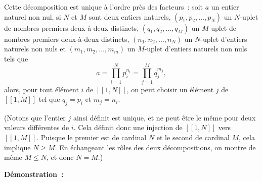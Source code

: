 Cette décomposition est unique à l'ordre près des facteurs : soit $a$ un entier naturel non nul, si $N$ et $M$ sont deux entiers naturels, $\left( p_1, p_2, \dots, p_N \right)$ un $N$-uplet de nombres premiers deux-à-deux distincts, $\left( q_1, q_2, \dots, q_M \right)$ un $M$-uplet de nombres premiers deux-à-deux distincts, $\left( n_1, n_2, \dots, n_N \right)$ un $N$-uplet d'entiers naturels non nuls et $\left( m_1, m_2, \dots, m_m \right)$ un $M$-uplet d'entiers naturels non nuls tels que 
\begin{equation*}
    a = \prod_{i=1}^N p_i^{n_i} = \prod_{j=1}^M q_j^{m_j},
\end{equation*}
alors, pour tout élément $i$ de $[\![1,N]\!]$, on peut choisir un élément $j$ de $[\![1,M]\!]$ tel que $q_j = p_i$ et $m_j = n_i$.

(Notons que l'entier $j$ ainsi définit est unique, et ne peut être le même pour deux valeurs différentes de $i$. 
Cela définit donc une injection de $[\![1,N]\!]$ vers $[\![1,M]\!]$. 
Puisque le premier est de cardinal $N$ et le second de cardinal $M$, cela implique $N \geq M$. 
En échangeant les rôles des deux décompositions, on montre de même $M \leq N$, et donc $N = M$.)

\medskip

\noindent\textbf{Démonstration :} 

